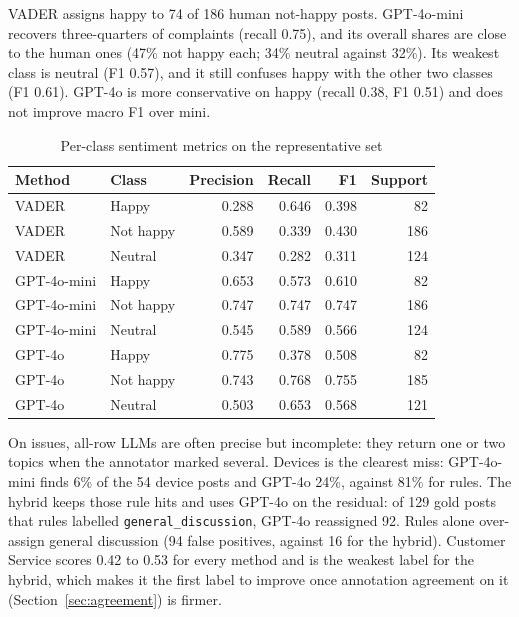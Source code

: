 \documentclass[11pt,a4paper]{article}
\begin{document}
VADER assigns happy to 74 of 186 human not-happy posts. GPT-4o-mini recovers three-quarters of complaints (recall 0.75), and its overall shares are close to the human ones (47\% not happy each; 34\% neutral against 32\%). Its weakest class is neutral (F1 0.57), and it still confuses happy with the other two classes (F1 0.61). GPT-4o is more conservative on happy (recall 0.38, F1 0.51) and does not improve macro F1 over mini.

\begin{table}[H]
\centering
\caption{Per-class sentiment metrics on the representative set}
\label{tab:sentclass}
\begin{tabular}{llrrrr}
\toprule
\textbf{Method} & \textbf{Class} & \textbf{Precision} & \textbf{Recall} & \textbf{F1} & \textbf{Support} \\
\midrule
VADER & Happy & 0.288 & 0.646 & 0.398 & 82 \\
VADER & Not happy & 0.589 & 0.339 & 0.430 & 186 \\
VADER & Neutral & 0.347 & 0.282 & 0.311 & 124 \\
GPT-4o-mini & Happy & 0.653 & 0.573 & 0.610 & 82 \\
GPT-4o-mini & Not happy & 0.747 & 0.747 & 0.747 & 186 \\
GPT-4o-mini & Neutral & 0.545 & 0.589 & 0.566 & 124 \\
GPT-4o & Happy & 0.775 & 0.378 & 0.508 & 82 \\
GPT-4o & Not happy & 0.743 & 0.768 & 0.755 & 185 \\
GPT-4o & Neutral & 0.503 & 0.653 & 0.568 & 121 \\
\bottomrule
\end{tabular}
\end{table}

On issues, all-row LLMs are often precise but incomplete: they return one or two topics when the annotator marked several. Devices is the clearest miss: GPT-4o-mini finds 6\% of the 54 device posts and GPT-4o 24\%, against 81\% for rules. The hybrid keeps those rule hits and uses GPT-4o on the residual: of 129 gold posts that rules labelled \texttt{general\_discussion}, GPT-4o reassigned 92. Rules alone over-assign general discussion (94 false positives, against 16 for the hybrid). Customer Service scores 0.42 to 0.53 for every method and is the weakest label for the hybrid, which makes it the first label to improve once annotation agreement on it (Section~\ref{sec:agreement}) is firmer.
\end{document}
